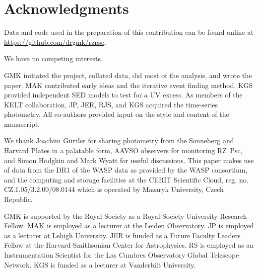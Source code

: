 \documentclass[useAMS,usenatbib,usegraphicx]{mn2e}
\begin{document}
\section*{Acknowledgments}

Data and code used in the preparation of this contribution can be found online at
\href{https://github.com/drgmk/rzpsc}{https://github.com/drgmk/rzpsc}.

We have no competing interests.

GMK initiated the project, collated data, did most of the analysis, and wrote the
paper. MAK contributed early ideas and the iterative event finding method. KGS provided
independent SED models to test for a UV excess. As members of the KELT collaboration, JP,
JER, RJS, and KGS acquired the time-series photometry. All co-authors provided input on
the style and content of the manuscript.

We thank Joachim G\"urtler for sharing photometry from the Sonneberg and Harvard Plates
in a palatable form, AAVSO observers for monitoring RZ~Psc, and Simon Hodgkin and Mark
Wyatt for useful discussions. This paper makes use of data from the DR1 of the WASP data
\citep{2010A&A...520L..10B} as provided by the WASP consortium, and the computing and
storage facilities at the CERIT Scientific Cloud, reg. no. CZ.1.05/3.2.00/08.0144 which
is operated by Masaryk University, Czech Republic.

GMK is supported by the Royal Society as a Royal Society University Research Fellow. MAK
is employed as a lecturer at the Leiden Observatory. JP is employed as a lecturer at
Lehigh University. JER is funded as a Future Faculty Leaders Fellow at the
Harvard-Smithsonian Center for Astrophysics. RS is employed as an Instrumentation
Scientist for the Las Cumbres Observatory Global Telescope Network. KGS is funded as a
lecturer at Vanderbilt University.

 

%
\end{document}
